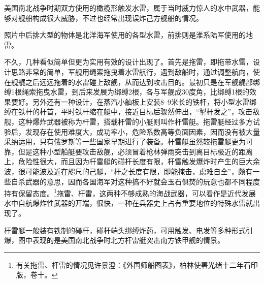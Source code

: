 \documentclass[12pt,UTF8]{ctexbook}
\begin{document}
美国南北战争时期双方使用的橄榄形触发水雷，属于当时威力惊人的水中武器，能够对舰船构成很大威胁，不过也经常出现误炸己方舰船的情况。

照片中后排大型的物体是北洋海军使用的各型水雷，前排则是淮系陆军使用的地雷。

不久，几种看似简单但更为实用有效的设计出现了。首先是拖雷，即拖带水雷，设计思路非常的简单，军舰用绳索拖曳着水雷航行，遇到敌船时，通过调整航向，使在舰艉之后远远拖着的水雷碰上敌舰，从而达到攻击目的。最初只是在军舰艉部绑缚1根绳索拖曳水雷，到后来发展为绑缚2根，各与军舰成30度角，比绑缚1根的效果要好。另外还有一种设计，在蒸汽小舢板上安装8--9米长的铁杆，将小型水雷绑缚在铁杆的杆首，平时铁杆缩在艇中，接近目标后骤然伸出，“掣杆发之”，攻击敌舰，这种爆炸武器被称为杆雷，搭载杆雷的小艇则叫作杆雷艇。拖雷艇经过多方试验后，发现存在使用难度大，成功率小，危险系数高等负面因素，因而没有被大量采纳运用，只有俄罗斯等一些国家早期进行了装备。杆雷艇虽然较拖雷艇更为可靠，但是这种小型船艇要攻击敌舰，必须冒着枪林弹雨突击到离目标极近的距离上，危险性很大，而且因为杆雷艇的碰杆长度有限，杆雷触发爆炸时产生的巨大余波，很可能波及近在咫尺的己艇，“杆之长度有限，即能掩击，虑难自全”，颇有一些自杀武器的意思，因而各国海军对这种搞不好就会玉石俱焚的玩意也都不同程度持有保留态度。\footnote{有关拖雷、杆雷的情况见许景澄：《外国师船图表》，柏林使署光绪十二年石印版，卷十。}拖雷、杆雷，这两种不够成熟的海战武器，可以看作是近代发展水中自航爆炸性武器的开端，很快，一种在兵器史上占有重要地位的特殊水雷就出现了。

杆雷艇一般装有铁制的碰杆，碰杆端头绑缚炸药，可用触发、电发等多种形式引爆，图中表现的是美国南北战争时北方杆雷艇突击南方铁甲舰的情景。
\end{document}
